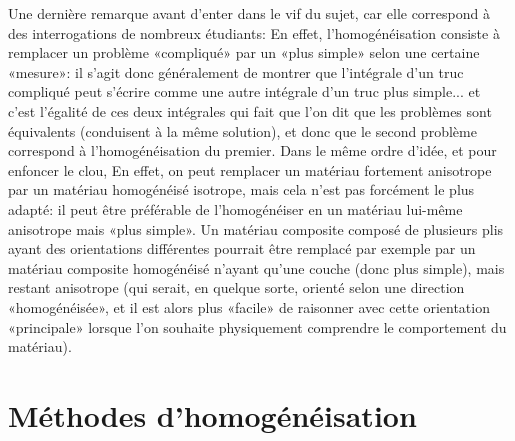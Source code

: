 \medskip
Une dernière remarque avant d'enter dans le vif du sujet, car elle correspond à des interrogations de nombreux étudiants:  En effet, l'homogénéisation consiste à remplacer un problème «compliqué» par un «plus simple» selon une certaine «mesure»: il s'agit donc généralement de montrer que l'intégrale d'un truc compliqué peut s'écrire comme une autre intégrale d'un truc plus simple... et c'est l'égalité de ces deux intégrales qui fait que l'on dit que les problèmes sont équivalents (conduisent à la même solution), et donc que le second problème correspond à l'homogénéisation du premier. Dans le même ordre d'idée, et pour enfoncer le clou,  En effet, on peut remplacer un matériau fortement anisotrope par un matériau homogénéisé isotrope, mais cela n'est pas forcément le plus adapté: il peut être préférable de l'homogénéiser en un matériau lui-même anisotrope mais «plus simple». Un matériau composite composé de plusieurs plis ayant des orientations différentes pourrait être remplacé par exemple par un matériau composite homogénéisé n'ayant qu'une couche (donc plus simple), mais restant anisotrope (qui serait, en quelque sorte, orienté selon une direction «homogénéisée», et il est alors plus «facile» de raisonner avec cette orientation «principale» lorsque l'on souhaite physiquement comprendre le comportement du matériau).


\medskip
\section{Méthodes d'homogénéisation}

